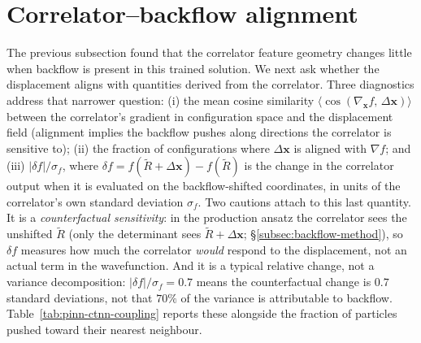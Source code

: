 \section{Correlator--backflow alignment}
\label{sec:repr-coupling}

The previous subsection found that the correlator feature geometry changes little when
backflow is present in this trained solution.
We next ask whether the displacement aligns with quantities derived from the correlator.
Three diagnostics address that narrower question:
(i) the mean cosine similarity $\langle\cos(\nabla_{\mathbf{x}} f,\,\Delta\mathbf{x})\rangle$
between the correlator's gradient in configuration space and the displacement field
(alignment implies the backflow pushes along directions the correlator is sensitive to);
(ii) the fraction of configurations where $\Delta\mathbf{x}$ is aligned with $\nabla f$;
and (iii) $|\delta f|/\sigma_f$, where $\delta f = f(\tilde R+\Delta\mathbf x)-f(\tilde R)$
is the change in the correlator output when it is evaluated on the backflow-shifted
coordinates, in units of the correlator's own standard deviation $\sigma_f$. Two
cautions attach to this last quantity. It is a \emph{counterfactual sensitivity}: in the
production ansatz the correlator sees the unshifted $\tilde R$ (only the determinant sees
$\tilde R+\Delta\mathbf x$; \S\ref{subsec:backflow-method}), so $\delta f$ measures how
much the correlator \emph{would} respond to the displacement, not an actual term in the
wavefunction. And it is a typical relative change, not a variance decomposition:
$|\delta f|/\sigma_f=0.7$ means the counterfactual change is $0.7$ standard deviations,
not that $70\%$ of the variance is attributable to backflow.
Table~\ref{tab:pinn-ctnn-coupling} reports these alongside the fraction of particles pushed
toward their nearest neighbour.

